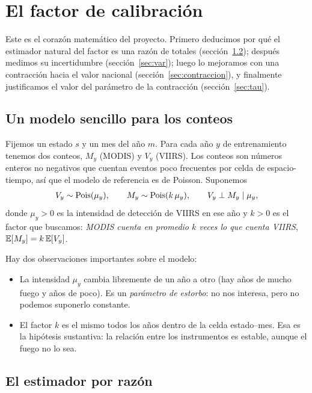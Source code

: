 \chapter{El factor de calibración}\label{cap:factor}

Este es el corazón matemático del proyecto. Primero deducimos por qué el estimador natural del factor es una razón de totales (sección~\ref{sec:est-razon}); después medimos su incertidumbre (sección~\ref{sec:var}); luego lo mejoramos con una contracción hacia el valor nacional (sección~\ref{sec:contraccion}), y finalmente justificamos el valor del parámetro de la contracción (sección~\ref{sec:tau}).

\section{Un modelo sencillo para los conteos}\label{sec:modelo}

Fijemos un estado $s$ y un mes del año $m$. Para cada año $y$ de entrenamiento tenemos dos conteos, $M_y$ (MODIS) y $V_y$ (VIIRS). Los conteos son números enteros no negativos que cuentan eventos poco frecuentes por celda de espacio-tiempo, así que el modelo de referencia es de Poisson. Suponemos
\begin{align*}
  V_y\sim\operatorname{Pois}(\mu_y),\qquad M_y\sim\operatorname{Pois}(k\,\mu_y),\qquad V_y\perp M_y\mid \mu_y,
\end{align*}
donde $\mu_y>0$ es la intensidad de detección de VIIRS en ese año y $k>0$ es el factor que buscamos: \emph{MODIS cuenta en promedio $k$ veces lo que cuenta VIIRS}, $\mathbb{E}[M_y]=k\,\mathbb{E}[V_y]$.

Hay dos observaciones importantes sobre el modelo:

\begin{itemize}
  \item La intensidad $\mu_y$ cambia libremente de un año a otro (hay años de mucho fuego y años de poco). Es un \emph{parámetro de estorbo}: no nos interesa, pero no podemos suponerlo constante.
  \item El factor $k$ es el mismo todos los años dentro de la celda estado--mes. Esa es la hipótesis sustantiva: la relación entre los instrumentos es estable, aunque el fuego no lo sea.
\end{itemize}

\section{El estimador por razón}\label{sec:est-razon}

